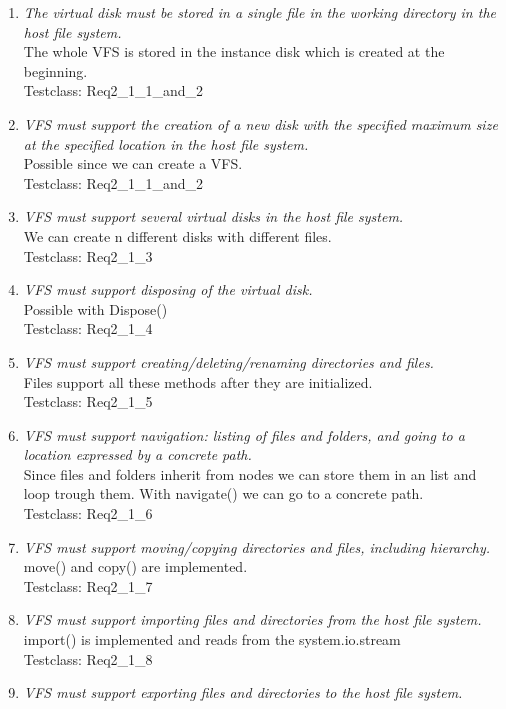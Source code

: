 \documentclass[a4paper,12pt]{article}
\begin{document}
\begin{enumerate}
	\item \emph{The virtual disk must be stored in a single file in the working directory in the host file system.}\\
		The whole VFS is stored in the instance disk which is created at the beginning.\\
		Testclass: Req2\_1\_1\_and\_2
	\item \emph{VFS must support the creation of a new disk with the specified maximum size at the specified
location in the host file system.}\\
		Possible since we can create a VFS.\\
		Testclass: Req2\_1\_1\_and\_2
	\item \emph{VFS must support several virtual disks in the host file system.}\\
		We can create n different disks with different files.\\
		Testclass: Req2\_1\_3
	\item \emph{VFS must support disposing of the virtual disk.}\\
		Possible with Dispose()\\
		Testclass: Req2\_1\_4
	\item \emph{VFS must support creating/deleting/renaming directories and files.}\\
		Files support all these methods after they are initialized.\\
		Testclass: Req2\_1\_5
	\item \emph{VFS must support navigation: listing of files and folders, and going to a location expressed by a
concrete path.}\\
		Since files and folders inherit from nodes we can store them in an list and loop trough them. With navigate() we can go to a concrete path.\\
		Testclass: Req2\_1\_6
	\item \emph{VFS must support moving/copying directories and files, including hierarchy.}\\
		move() and copy() are implemented.\\
		Testclass: Req2\_1\_7
	\item \emph{VFS must support importing files and directories from the host file system.}\\
		import() is implemented and reads from the system.io.stream\\
		Testclass: Req2\_1\_8
	\item \emph{VFS must support exporting files and directories to the host file system.}\\

\end{enumerate}
\end{document}
